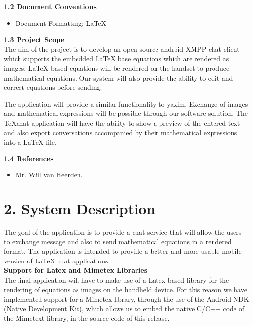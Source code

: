 \documentclass[29pt,a4paper]{moderncv}
\begin{document}
		\noindent \textbf{1.2 Document Conventions}
			\begin{itemize}
				\item Document Formatting: LaTeX
			\end{itemize}
		\vspace{5mm}
		
		\noindent \textbf{1.3 Project Scope}
			\\The aim of the project is to develop an open source android XMPP chat client which supports the embedded LaTeX base equations which are rendered as images. LaTeX based equations will be rendered on the handset to produce mathematical equations. Our system will also provide the ability to edit and correct equations before sending.
			
			\parindent 5mm The application will provide a similar functionality to yaxim. Exchange of images and mathematical expressions will be possible through our software solution. The TeXchat application will have the ability to show a preview of the entered text and also export conversations accompanied by their mathematical expressions into a LaTeX file.
			
		\vspace{5mm}
		
	\noindent \textbf{1.4 References}
		\begin{itemize}
		\item Mr. Will van Heerden.
		\end{itemize}
		\vspace{5mm}
		
\newpage
	\section*{\textbf{2. System Description}}
	\vspace{4mm}
		\noindent The goal of the application is to provide a chat service that will allow the users to exchange message and also to send mathematical equations in a rendered format. The application is intended to provide a better and more usable mobile version of LaTeX chat applications.\\ 
		
		\noindent\textbf{Support for Latex and Mimetex Libraries}
		\\The final application will have to make use of a Latex based library for the rendering of equations as images on the handheld device. For this reason we have implemented support for a Mimetex library, through the use of the Android NDK (Native Development Kit), which allows us to embed the native C/C++ code of the Mimetext library, in the source code of this release.\\
		
\end{document}
